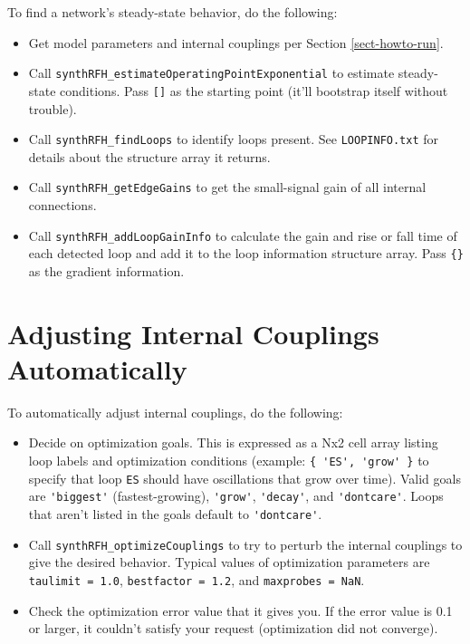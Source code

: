 To find a network's steady-state behavior, do the following:

\begin{sloppypar}
\begin{itemize}
%
\item Get model parameters and internal couplings per Section
\ref{sect-howto-run}.
%
\item Call \verb|synthRFH_estimateOperatingPointExponential| to estimate
steady-state conditions. Pass \verb|[]| as the starting point (it'll
bootstrap itself without trouble).
%
\item Call \verb|synthRFH_findLoops| to identify loops present. See
\verb|LOOPINFO.txt| for details about the structure array it returns.
%
\item Call \verb|synthRFH_getEdgeGains| to get the small-signal gain of
all internal connections.
%
\item Call \verb|synthRFH_addLoopGainInfo| to calculate the gain and rise
or fall time of each detected loop and add it to the loop information
structure array. Pass \verb|{}| as the gradient information.
%
\end{itemize}
\end{sloppypar}

%
%
\section{Adjusting Internal Couplings Automatically}
\label{sect-howto-tuning}

To automatically adjust internal couplings, do the following:

\begin{sloppypar}
\begin{itemize}
%
\item Decide on optimization goals. This is expressed as a Nx2 cell array
listing loop labels and optimization conditions (example:
\verb|{ 'ES', 'grow' }| to specify that loop \verb|ES| should have
oscillations that grow over time). Valid goals are \verb|'biggest'|
(fastest-growing), \verb|'grow'|, \verb|'decay'|, and \verb|'dontcare'|.
Loops that aren't listed in the goals default to \verb|'dontcare'|.
%
\item Call \verb|synthRFH_optimizeCouplings| to try to perturb the
internal couplings to give the desired behavior. Typical values of
optimization parameters are \verb|taulimit = 1.0|, \verb|bestfactor = 1.2|,
and \verb|maxprobes = NaN|.
%
\item Check the optimization error value that it gives you. If the error
value is 0.1 or larger, it couldn't satisfy your request (optimization did
not converge).
%
\end{itemize}
\end{sloppypar}

